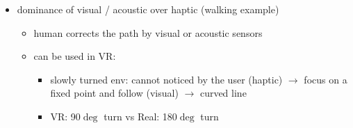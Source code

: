 \documentclass{standalone}
\begin{document}
\begin{itemize}
	\item dominance of visual / acoustic over haptic (walking example)
		\begin{itemize}
			\item human corrects the path by visual or acoustic sensors
			\item can be used in VR:
				\begin{itemize}
					\item slowly turned env: cannot noticed by the user (haptic) $\rightarrow$ focus on a fixed point and follow (visual) $\rightarrow$ curved line
					\item VR: 90$\deg$ turn vs Real: 180$\deg$ turn
				\end{itemize}
		\end{itemize}
\end{itemize}
\end{document}
